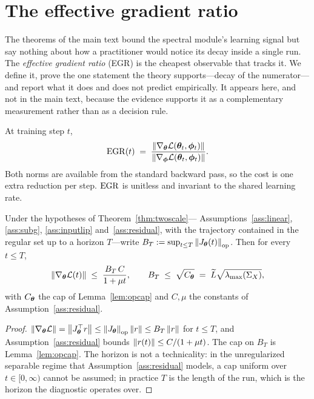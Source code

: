 \section{The effective gradient ratio}
\label{app:egr}

The theorems of the main text bound the spectral module's learning signal
but say nothing about how a practitioner would notice its decay inside a
single run. The \emph{effective gradient ratio} (EGR) is the cheapest
observable that tracks it. We define it, prove the one statement the theory
supports---decay of the numerator---and report what it does and does not
predict empirically. It appears here, and not in the main text, because the
evidence supports it as a complementary measurement rather than as a
decision rule.

\begin{definition}
\label{def:egr}
At training step $t$,
\[
    \mathrm{EGR}(t) \;=\;
    \frac{\left\lVert\nabla_{\boldsymbol{\theta}} \mathcal{L}({\boldsymbol{\theta}}_t, {\boldsymbol{\phi}}_t)\right\rVert}
         {\left\lVert\nabla_{\boldsymbol{\phi}} \mathcal{L}({\boldsymbol{\theta}}_t, {\boldsymbol{\phi}}_t)\right\rVert} .
\]
Both norms are available from the standard backward pass, so the cost is one
extra reduction per step. $\mathrm{EGR}$ is unitless and invariant to the shared
learning rate.
\end{definition}

\begin{proposition}
\label{prop:egr_monotonic}
Under the hypotheses of Theorem~\ref{thm:twoscale}---%
Assumptions~\ref{ass:linear}, \ref{ass:subg}, \ref{ass:inputlip}
and~\ref{ass:residual}, with the trajectory contained in the regular set up
to a horizon $T$---write
$B_T := \sup_{t \leq T} \left\lVert J_{\boldsymbol{\theta}}(t)\right\rVert_{\mathrm{op}}$. Then for every
$t \leq T$,
\[
    \left\lVert\nabla_{\boldsymbol{\theta}} \mathcal{L}(t)\right\rVert \;\leq\; \frac{B_T\,C}{1 + \mu t},
    \qquad
    B_T \;\leq\; \sqrt{C_{\boldsymbol{\theta}}}
    \;=\; \widetilde{L}\sqrt{\lambda_{\max}(\Sigma_X)},
\]
with $C_{\boldsymbol{\theta}}$ the cap of Lemma~\ref{lem:opcap} and $C, \mu$ the constants
of Assumption~\ref{ass:residual}.
\end{proposition}

\begin{proof}
$\left\lVert\nabla_{\boldsymbol{\theta}} \mathcal{L}\right\rVert = \left\lVert J_{\boldsymbol{\theta}}^\top r\right\rVert \leq
\left\lVert J_{\boldsymbol{\theta}}\right\rVert_{\mathrm{op}} \left\lVert r\right\rVert \leq B_T \left\lVert r\right\rVert$ for $t \leq T$,
and Assumption~\ref{ass:residual} bounds $\left\lVert r(t)\right\rVert \leq C/(1 + \mu t)$.
The cap on $B_T$ is Lemma~\ref{lem:opcap}. The horizon is not a
technicality: in the unregularized separable regime that
Assumption~\ref{ass:residual} models, a cap uniform over
$t \in [0, \infty)$ cannot be assumed; in practice $T$ is the length of the
run, which is the horizon the diagnostic operates over.
\end{proof}

